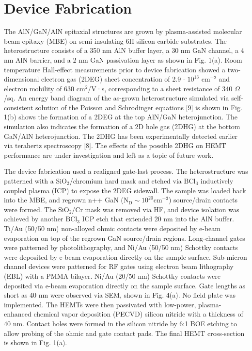 \documentclass[journal]{IEEEtran}
\begin{document}
\section{Device Fabrication}
The AlN/GaN/AlN epitaxial structures are grown by plasma-assisted molecular beam epitaxy (MBE) on semi-insulating 6H silicon carbide substrates. The heterostructure consists of a 350 nm AlN buffer layer, a 30 nm GaN channel, a 4 nm AlN barrier, and a 2 nm GaN passivation layer as shown in Fig. 1(a). Room temperature Hall-effect measurements prior to device fabrication showed a two-dimensional electron gas (2DEG) sheet concentration of 2.9 $\cdot$ $\mathrm{10^{13}}$ $\mathrm{cm^{-2}}$ and electron mobility of 630 $\mathrm{cm^2}$/V·s, corresponding to a sheet resistance of 340 $\Omega$/sq. An energy band diagram of the as-grown heterostructure simulated via self-consistent solution of the Poisson and Schrodinger equations [9] is shown in Fig. 1(b) shows the formation of a 2DEG at the top AlN/GaN heterojunction. The simulation also indicates the formation of a 2D hole gas (2DHG) at the bottom GaN/AlN heterojunction. The 2DHG has been experimentally detected earlier via terahertz spectroscopy [8]. The effects of the possible 2DHG on HEMT performance are under investigation and left as a topic of future work.

The device fabrication used a realigned gate-last process. The heterostructure was patterned with a $\mathrm{SiO_2}$/chromium hard mask and etched via $\mathrm{BCl_3}$ inductively coupled plasma (ICP) to expose the 2DEG sidewall. The sample was loaded back into the MBE, and regrown n++ GaN ($\mathrm{N_D}\sim10^{20} \mathrm{cm^{-3}}$) source/drain contacts were formed. The $\mathrm{SiO_2}$/Cr mask was removed via HF, and device isolation was achieved by another $\mathrm{BCl_3}$ ICP etch that extended 20 nm into the AlN buffer. Ti/Au (50/50 nm) non-alloyed ohmic contacts were deposited by e-beam evaporation on top of the regrown GaN source/drain regions. Long-channel gates were patterned by photolithography, and Ni/Au (50/50 nm) Schottky contacts were deposited by e-beam evaporation directly on the sample surface. Sub-micron channel devices were patterned for RF gates using electron beam lithography (EBL) with a PMMA bilayer. Ni/Au (20/50 nm) Schottky contacts were deposited via e-beam evaporation directly on the sample surface. Gate lengths as short as 40 nm were observed via SEM, shown in Fig. 4(a). No field plate was implemented. The HEMTs were then passivated with low-power, plasma-enhanced chemical vapor deposition (PECVD) silicon nitride with a thickness of 40 nm. Contact holes were formed in the silicon nitride by 6:1 BOE etching to allow probing of the ohmic and gate contact pads. The final HEMT cross-section is shown in Fig. 1(a).
\end{document}
